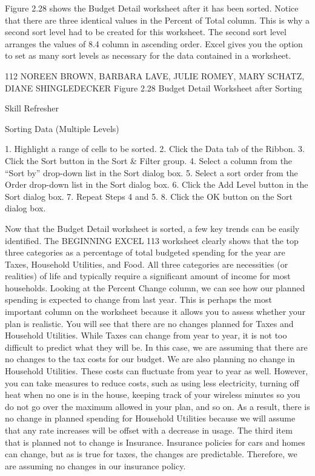 Figure 2.28 shows the Budget Detail worksheet after it has been sorted. Notice that there are three
identical values in the Percent of Total column. This is why a second sort level had to be created for
this worksheet. The second sort level arranges the values of 8.4%
column in ascending order. Excel gives you the option to set as many sort levels as necessary for the
data contained in a worksheet.




112 NOREEN BROWN, BARBARA LAVE, JULIE ROMEY, MARY SCHATZ, DIANE SHINGLEDECKER
Figure 2.28 Budget Detail Worksheet after Sorting




Skill Refresher


Sorting Data (Multiple Levels)

1. Highlight a range of cells to be sorted.
2. Click the Data tab of the Ribbon.
3. Click the Sort button in the Sort \& Filter group.
4. Select a column from the “Sort by” drop-down list in the Sort dialog box.
5. Select a sort order from the Order drop-down list in the Sort dialog box.
6. Click the Add Level button in the Sort dialog box.
7. Repeat Steps 4 and 5.
8. Click the OK button on the Sort dialog box.



Now that the Budget Detail worksheet is sorted, a few key trends can be easily identified. The
BEGINNING EXCEL 113
worksheet clearly shows that the top three categories as a percentage of total budgeted spending for
the year are Taxes, Household Utilities, and Food. All three categories are necessities (or realities) of
life and typically require a significant amount of income for most households. Looking at the Percent
Change column, we can see how our planned spending is expected to change from last year. This is
perhaps the most important column on the worksheet because it allows you to assess whether your
plan is realistic. You will see that there are no changes planned for Taxes and Household Utilities.
While Taxes can change from year to year, it is not too difficult to predict what they will be. In this
case, we are assuming that there are no changes to the tax costs for our budget. We are also planning
no change in Household Utilities. These costs can fluctuate from year to year as well. However, you
can take measures to reduce costs, such as using less electricity, turning off heat when no one is in the
house, keeping track of your wireless minutes so you do not go over the maximum allowed in your
plan, and so on. As a result, there is no change in planned spending for Household Utilities because
we will assume that any rate increases will be offset with a decrease in usage. The third item that is
planned not to change is Insurance. Insurance policies for cars and homes can change, but as is true
for taxes, the changes are predictable. Therefore, we are assuming no changes in our insurance policy.

